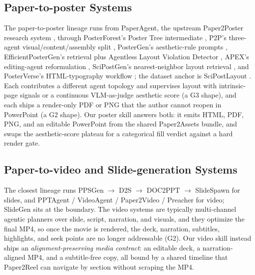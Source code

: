 \documentclass{article}
\begin{document}
\subsection{Paper-to-poster Systems}\label{sec:rw-poster}

The paper-to-poster lineage runs from PaperAgent, the upstream Paper2Poster research system \citep{paper2poster}, through PosterForest's Poster Tree intermediate \citep{posterforest}, P2P's three-agent visual/content/assembly split \citep{p2p}, PosterGen's aesthetic-rule prompts \citep{postergen}, EfficientPosterGen's retrieval plus Agentless Layout Violation Detector \citep{efficientpostergen}, APEX's editing-agent reformulation \citep{apex}, SciPostGen's nearest-neighbor layout retrieval \citep{scipostgen}, and PosterVerse's HTML-typography workflow \citep{posterverse}; the dataset anchor is SciPostLayout \citep{scipostlayout}. Each contributes a different agent topology and supervises layout with intrinsic-page signals or a continuous VLM-as-judge aesthetic score (a G3 shape), and each ships a render-only PDF or PNG that the author cannot reopen in PowerPoint (a G2 shape). Our poster skill answers both: it emits HTML, PDF, PNG, and an editable PowerPoint from the shared Paper2Assets bundle, and swaps the aesthetic-score plateau for a categorical fill verdict against a hard render gate.

\subsection{Paper-to-video and Slide-generation Systems}\label{sec:rw-video}

The closest lineage runs PPSGen \citep{hu2014ppsgen} $\to$ D2S \citep{sun2021d2s} $\to$ DOC2PPT \citep{fu2022doc2ppt} $\to$ SlideSpawn \citep{kumar2024slidespawn} for slides, and PPTAgent \citep{zheng2025pptagent} / VideoAgent \citep{videoagent2025} / Paper2Video \citep{paper2video} / Preacher \citep{preacher2025} for video; SlideGen \citep{slidegen} sits at the boundary. The video systems are typically multi-channel agentic planners over slide, script, narration, and visuals, and they optimize the final MP4, so once the movie is rendered, the deck, narration, subtitles, highlights, and seek points are no longer addressable (G2). Our video skill instead ships an \emph{alignment-preserving media contract}: an editable deck, a narration-aligned MP4, and a subtitle-free copy, all bound by a shared timeline that Paper2Reel can navigate by section without scraping the MP4.
\end{document}
